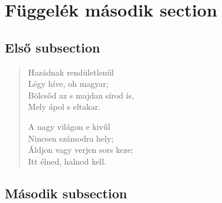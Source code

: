 \documentclass{article}
\begin{document}
\section{Függelék második section}
\subsection{Első subsection}
\begin{verse}
Hazádnak rendületlenűl\\
Légy híve, oh magyar;\\
Bölcsőd az s majdan sírod is,\\
Mely ápol s eltakar.\newline

A nagy világon e kivűl\\
Nincsen számodra hely;\\
Áldjon vagy verjen sors keze;\\
Itt élned, halnod kell.
\end{verse}
\subsection{Második subsection}
\end{document}
